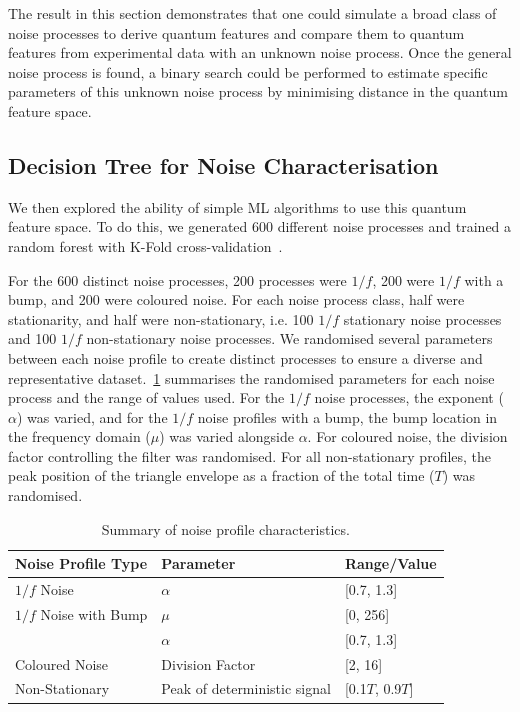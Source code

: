 \documentclass[12pt]{iopart}
\begin{document}
The result in this section demonstrates that one could simulate a broad class of noise processes to derive quantum features and compare them to quantum features from experimental data with an unknown noise process. Once the general noise process is found, a binary search could be performed to estimate specific parameters of this unknown noise process by minimising distance in the quantum feature space.

\subsection{Decision Tree for Noise Characterisation \label{subsec:decision_tree_for_noise_characterisation}}
We then explored the ability of simple ML algorithms to use this quantum feature space. To do this, we generated 600 different noise processes and trained a random forest with K-Fold cross-validation~\cite{james2013introduction, scikit-learn}.

For the 600 distinct noise processes, 200 processes were $1/f$, 200 were $1/f$ with a bump, and 200 were coloured noise. For each noise process class, half were stationarity, and half were non-stationary, i.e. 100 $1/f$ stationary noise processes and 100 $1/f$ non-stationary noise processes. We randomised several parameters between each noise profile to create distinct processes to ensure a diverse and representative dataset.~\cref{tab:noise_profiles} summarises the randomised parameters for each noise process and the range of values used. For the $1/f$ noise processes, the exponent ($\alpha$) was varied, and for the $1/f$ noise profiles with a bump, the bump location in the frequency domain ($\mu$) was varied alongside $\alpha$. For coloured noise, the division factor controlling the filter was randomised. For all non-stationary profiles, the peak position of the triangle envelope as a fraction of the total time ($T$) was randomised.

\begin{table}[h!]
    \centering
    \begin{tabular}{|l|l|l|}
        \hline
        \textbf{Noise Profile Type} & \textbf{Parameter}           & \textbf{Range/Value} \\ \hline
        $1/f$ Noise                 & $\alpha$                     & [0.7, 1.3]           \\ \hline
        $1/f$ Noise with Bump       & $\mu$                        & [0, 256]             \\ \cline{2-3}
                                    & $\alpha$                     & [0.7, 1.3]           \\ \hline
        Coloured Noise              & Division Factor              & [2, 16]              \\ \hline
        Non-Stationary              & Peak of deterministic signal & [0.1$T$, 0.9$T$]     \\ \hline
    \end{tabular}
    \caption{Summary of noise profile characteristics.}
    \label{tab:noise_profiles}
\end{table}
\end{document}
